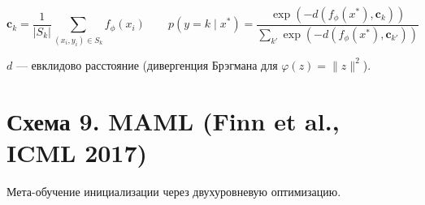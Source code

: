 \documentclass[12pt,a4paper]{article}
\begin{document}
\[
\mathbf{c}_k = \frac{1}{|S_k|} \sum_{(x_i, y_i) \in S_k} f_\phi(x_i)
\qquad
p(y\!=\!k \mid x^*) = \frac{\exp(-d(f_\phi(x^*), \mathbf{c}_k))}{\sum_{k'} \exp(-d(f_\phi(x^*), \mathbf{c}_{k'}))}
\]

$d$ --- евклидово расстояние (дивергенция Брэгмана для $\varphi(z) = \|z\|^2$).


\newpage
\section*{Схема 9. MAML (Finn et al., ICML 2017)}

Мета-обучение инициализации через двухуровневую оптимизацию.
\end{document}

